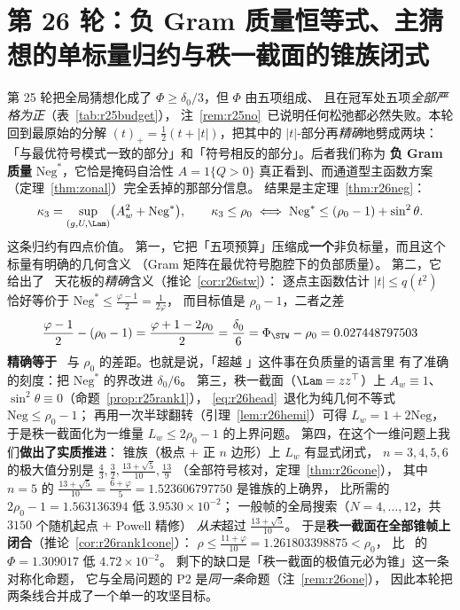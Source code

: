 \section{第 26 轮：负 Gram 质量恒等式、主猜想的单标量归约与秩一截面的锥族闭式}\label{sec:r26}

第 25 轮把全局猜想化成了 $\Phi\ge\delta_0/3$，但 $\Phi$ 由五项组成、
且在冠军处五项\emph{全部严格为正}（表~\ref{tab:r25budget}），
注~\ref{rem:r25no}~已说明任何松弛都必然失败。本轮回到最原始的分解
$(t)_+=\frac12(t+|t|)$，把其中的 $|t|$-部分再\emph{精确}地劈成两块：
「与最优符号模式一致的部分」和「符号相反的部分」。后者我们称为
\textbf{负 Gram 质量} $\mathrm{Neg}^*$，它恰是掩码自洽性 $A=1\{Q>0\}$
真正看到、而通道型主函数方案（定理~\ref{thm:zonal}）完全丢掉的那部分信息。
结果是主定理~\ref{thm:r26neg}：
\begin{equation}\label{eq:r26head}
\kappa_3=\sup_{(g,U,\Lam)}\bigl(A_w^2+\mathrm{Neg}^*\bigr),
\qquad
\kappa_3\le\rho_0\iff
\mathrm{Neg}^*\le(\rho_0-1)+\sin^2\theta .
\end{equation}
这条归约有四点价值。
第一，它把「五项预算」压缩成\textbf{一个}非负标量，而且这个标量有明确的几何含义
（Gram 矩阵在最优符号胞腔下的负部质量）。
第二，它给出了 \STW\ 天花板的\emph{精确}含义（推论~\ref{cor:r26stw}）：
逐点主函数估计 $|t|\le q(t^2)$ 恰好等价于 $\mathrm{Neg}^*\le\frac{\varphi-1}2=\frac1{2\varphi}$，
而目标值是 $\rho_0-1$，二者之差
\[
\frac{\varphi-1}2-(\rho_0-1)=\frac{\varphi+1-2\rho_0}2=\frac{\delta_0}6
=\Phi_{\STW}-\rho_0=0.027448797503
\]
\textbf{精确等于} \STW\ 与 $\rho_0$ 的差距。也就是说，「超越 \STW」这件事在负质量的语言里
有了准确的刻度：把 $\mathrm{Neg}^*$ 的界改进 $\delta_0/6$。
第三，秩一截面（$\Lam=zz^\top$）上 $A_w\equiv1$、$\sin^2\theta\equiv0$（命题~\ref{prop:r25rank1}），
\eqref{eq:r26head}~退化为纯几何不等式 $\mathrm{Neg}\le\rho_0-1$；
再用一次半球翻转（引理~\ref{lem:r26hemi}）可得 $L_w=1+2\mathrm{Neg}$，
于是秩一截面化为一维量 $L_w\le2\rho_0-1$ 的上界问题。
第四，在这个一维问题上我们\textbf{做出了实质推进}：
锥族（极点 $+$ 正 $n$ 边形）上 $L_w$ 有显式闭式，
$n=3,4,5,6$ 的极大值分别是 $\frac43,\frac32,\frac{13+\sqrt5}{10},\frac{13}9$
（全部符号核对，定理~\ref{thm:r26cone}），
其中 $n=5$ 的 $\frac{13+\sqrt5}{10}=\frac{6+\varphi}5=1.523606797750$ 是锥族的上确界，
比所需的 $2\rho_0-1=1.563136394$ 低 $3.9530\times10^{-2}$；
一般帧的全局搜索（$N=4,\dots,12$，共 $3150$ 个随机起点 $+$ Powell 精修）
\emph{从未}超过 $\frac{13+\sqrt5}{10}$。
于是\textbf{秩一截面在全部锥帧上闭合}（推论~\ref{cor:r26rank1cone}）：
$\rho\le\frac{11+\varphi}{10}=1.261803398875<\rho_0$，
比 \STW\ 的 $\Phi=1.309017$ 低 $4.72\times10^{-2}$。
剩下的缺口是「秩一截面的极值元必为锥」这一条对称化命题，
它与全局问题的 P2 是\emph{同一条}命题（注~\ref{rem:r26one}），
因此本轮把两条线合并成了一个单一的攻坚目标。

